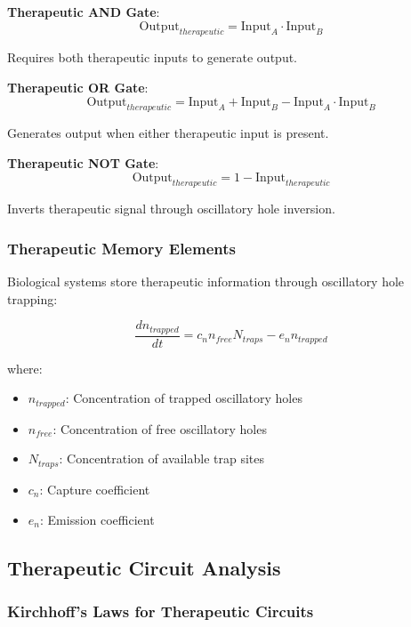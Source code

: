 \documentclass[12pt,a4paper]{article}
\begin{document}
\textbf{Therapeutic AND Gate}:
\begin{equation}
\text{Output}_{therapeutic} = \text{Input}_A \cdot \text{Input}_B
\end{equation}

Requires both therapeutic inputs to generate output.

\textbf{Therapeutic OR Gate}:
\begin{equation}
\text{Output}_{therapeutic} = \text{Input}_A + \text{Input}_B - \text{Input}_A \cdot \text{Input}_B
\end{equation}

Generates output when either therapeutic input is present.

\textbf{Therapeutic NOT Gate}:
\begin{equation}
\text{Output}_{therapeutic} = 1 - \text{Input}_{therapeutic}
\end{equation}

Inverts therapeutic signal through oscillatory hole inversion.

\subsubsection{Therapeutic Memory Elements}

Biological systems store therapeutic information through oscillatory hole trapping:

\begin{equation}
\frac{dn_{trapped}}{dt} = c_n n_{free} N_{traps} - e_n n_{trapped}
\end{equation}

where:
\begin{itemize}
\item $n_{trapped}$: Concentration of trapped oscillatory holes
\item $n_{free}$: Concentration of free oscillatory holes
\item $N_{traps}$: Concentration of available trap sites
\item $c_n$: Capture coefficient
\item $e_n$: Emission coefficient
\end{itemize}

\subsection{Therapeutic Circuit Analysis}

\subsubsection{Kirchhoff's Laws for Therapeutic Circuits}
\end{document}
